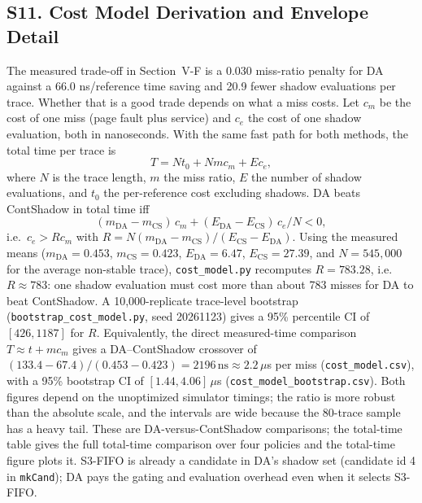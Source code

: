 \documentclass[journal,onecolumn]{IEEEtran}
\begin{document}
\subsection*{S11. Cost Model Derivation and Envelope Detail}
The measured trade-off in Section~V-F is a 0.030 miss-ratio penalty for DA
against a 66.0 ns/reference time saving and 20.9 fewer shadow evaluations per
trace. Whether that is a good trade depends on what a miss costs. Let $c_m$ be
the cost of one miss (page fault plus service) and $c_e$ the cost of one shadow
evaluation, both in nanoseconds. With the same fast path for both methods, the
total time per trace is
\begin{equation}
T = N t_0 + N m c_m + E c_e,
\label{eq:cost}
\end{equation}
where $N$ is the trace length, $m$ the miss ratio, $E$ the number of shadow
evaluations, and $t_0$ the per-reference cost excluding shadows. DA beats
ContShadow in total time iff
\begin{equation}
(m_{\mathrm{DA}} - m_{\mathrm{CS}})\,c_m
+ (E_{\mathrm{DA}} - E_{\mathrm{CS}})\,c_e/N < 0,
\label{eq:breakeven}
\end{equation}
i.e.\ $c_e > R c_m$ with
$R = N(m_{\mathrm{DA}} - m_{\mathrm{CS}})/(E_{\mathrm{CS}} - E_{\mathrm{DA}})$.
Using the measured means ($m_{\mathrm{DA}}=0.453$, $m_{\mathrm{CS}}=0.423$,
$E_{\mathrm{DA}}=6.47$, $E_{\mathrm{CS}}=27.39$, and $N=545{,}000$ for the
average non-stable trace), \texttt{cost\_model.py} recomputes $R = 783.28$,
i.e.\ $R \approx 783$: one shadow evaluation must cost more than about 783
misses for DA to beat ContShadow. A 10,000-replicate trace-level bootstrap
(\texttt{bootstrap\_cost\_model.py}, seed 20261123) gives a 95\% percentile CI
of $[426, 1187]$ for $R$. Equivalently, the direct measured-time comparison
$T \approx t + m c_m$ gives a DA--ContShadow crossover of
$(133.4-67.4)/(0.453-0.423) = 2196\,\mathrm{ns} \approx 2.2\,\mu$s per miss
(\texttt{cost\_model.csv}), with a 95\% bootstrap CI of
$[1.44, 4.06]\,\mu$s (\texttt{cost\_model\_bootstrap.csv}). Both figures depend
on the unoptimized simulator timings; the ratio is more robust than the
absolute scale, and the intervals are wide because the 80-trace sample has a
heavy tail. These are DA-versus-ContShadow comparisons; the total-time table
gives the full total-time comparison over four policies and
the total-time figure plots it. S3-FIFO is already a candidate in DA's shadow
set (candidate id 4 in \texttt{mkCand}); DA pays the gating and evaluation
overhead even when it selects S3-FIFO.
\end{document}
